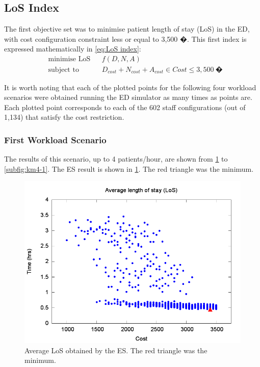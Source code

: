 \subsection{LoS Index}

The first objective set was to minimise patient length of stay (LoS)
in the ED, with cost configuration constraint less or equal to 3,500
�. This first index is expressed mathematically in \ref{eq:LoS index}:
\begin{equation}
\begin{aligned} & {\text{minimise LoS}} &  & f(D,N,A)\\
 & \text{subject to} &  & D_{cost}+N_{cost}+A_{cost}\in Cost\leq3,500\:\text{�}
\end{aligned}
\label{eq:LoS index}
\end{equation}


It is worth noting that each of the plotted points for the following
four workload scenarios were obtained running the ED simulator as
many times as points are. Each plotted point corresponds to each of
the 602 staff configurations (out of 1,134) that satisfy the cost
restriction.


\subsubsection{First Workload Scenario}

The results of this scenario, up to 4 patients/hour, are shown from
\ref{subfig:es4-1} to \ref{subfig:km4-1}. The ES result is shown
in \ref{subfig:es4-1}. The red triangle was the minimum. 
\begin{figure}[H]
\noindent \begin{centering}
\includegraphics[width=0.95\columnwidth,height=0.23\paperheight]{figs4/v0/6400-602-25-exh-LoS-min}
\par\end{centering}

\caption{Average LoS obtained by the ES. The red triangle was the minimum.
\label{subfig:es4-1}}
\end{figure}


